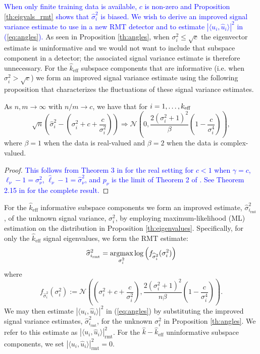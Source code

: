 \textcolor{blue}{When only finite training data is available, $c$ is non-zero and Proposition \ref{th:eigvals_rmt} shows that $\widehat{\sigma}_i^2$ is biased. We wish to derive an improved signal variance estimate to use in a new RMT detector and to estimate $|\langle u_i,\widehat{u}_i\rangle|^2$ in (\ref{eq:angles}).} As seen in Proposition \ref{th:angles}, when $\sigma_i^2\leq\sqrt{c}$ the eigenvector estimate is uninformative and we would not want to include that subspace component in a detector; the associated signal variance estimate is therefore unnecessary. For the $\widehat{k}_{\text{eff}}$ subspace components that are informative (i.e. when $\sigma_i^2 > \sqrt{c}$) we form an improved signal variance estimate using the following proposition that characterizes the fluctuations of these signal variance estimates.
\begin{prop}\label{th:eigenvalues}
As $n,m \longrightarrow \infty$ with $n/m \to c$, we have that for $i = 1, \ldots, k_\text{eff}$
\begin{equation*}
\sqrt{n}\left(\widehat{\sigma}_i^2-\left(\sigma_i^2+c+\frac{c}{\sigma_i^2}\right)\right)\Rightarrow\mathcal{N}\left(0,\frac{2\left(\sigma_i^2+1\right)^2}{\beta }\left(1-\frac{c}{\sigma_i^4}\right)\right),
\end{equation*}
where $\beta = 1$ when the data is real-valued and $\beta = 2$ when the data is complex-valued.
\end{prop}
\begin{proof}
\textcolor{blue}{This follows from Theorem 3 in \cite{paul2007asymptotics} for the real setting for $c<1$ when $\gamma=c$, $\ell_\nu-1=\sigma_\nu^2$, $\widehat{\ell}_\nu-1=\widehat{\sigma}_\nu^2$, and $p_\nu$ is the limit of Theorem 2 of \cite{paul2007asymptotics}. See Theorem 2.15 in \cite{benaych2011singular} for the complete result.}
\end{proof}
For the $\widehat{k}_{\text{eff}}$ informative subspace components we form an improved estimate, $\widehat{\sigma}^2_{i_\text{rmt}}$, of the unknown signal variance, $\sigma_{i}^{2}$, by employing maximum-likelihood (ML) estimation on the distribution in Proposition \ref{th:eigenvalues}. Specifically, for only the $\widehat{k}_{\text{eff}}$ signal eigenvalues, we form the RMT estimate:
\begin{equation}\label{eq:cov}
\widehat{\sigma}^2_{i_\text{rmt}} = \argmax_{\sigma_i^2} \log\left(f_{\widehat{\sigma}_i^2}(\sigma_i^2)\right)
\end{equation}
where
\begin{equation*}
f_{\widehat{\sigma}_i^2}(\sigma_i^2):=\mathcal{N}\left(\left(\sigma_i^2+c+\frac{c}{\sigma_i^2}\right),\frac{2\left(\sigma_i^2+1\right)^2}{n\beta }\left(1-\frac{c}{\sigma_i^4}\right)\right).
\end{equation*}
We may then estimate $|\langle u_i,\widehat{u}_i\rangle|^2$ in (\ref{eq:angles}) by substituting the improved signal variance estimates, $\widehat{\sigma}^2_{i_\text{rmt}}$, for the unknown $\sigma_i^2$ in Proposition \ref{th:angles}. We refer to this estimate as $|\langle u_i,\widehat{u}_i\rangle|^2_{\text{rmt}}$. For the $\widehat{k}-\widehat{k}_{\text{eff}}$ uninformative subspace components, we set $|\langle u_i,\widehat{u}_i\rangle|^2_{\text{rmt}}=0$.



